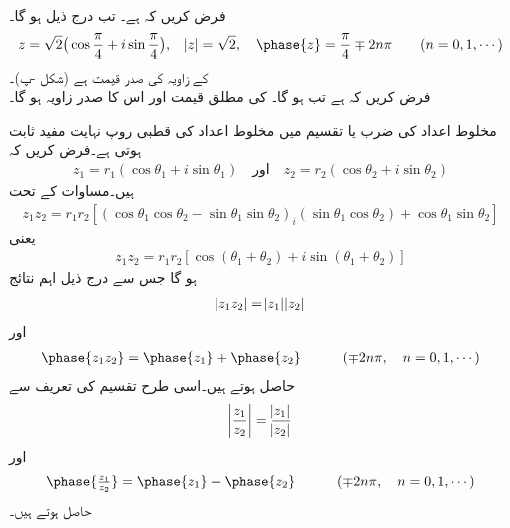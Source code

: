 \quad {}\\
فرض کریں کہ  ہے۔ تب درج ذیل ہو گا۔
\begin{align*}
z=\sqrt{2}\big(\cos \frac{\pi}{4}+i\sin\frac{\pi}{4}\big), \quad \abs{z}=\sqrt{2},\quad \phase{z}=\frac{\pi}{4}\mp2n\pi \quad \quad (n=0,1,\cdots)
\end{align*}
 کے زاویہ کی صدر قیمت  ہے (شکل -پ)۔
\quad {}\\
فرض کریں کہ  ہے تب  ہو گا۔ کی مطلق قیمت  اور اس کا صدر زاویہ  ہو گا۔

مخلوط اعداد کی  ضرب یا تقسیم میں مخلوط اعداد کی قطبی روپ نہایت مفید ثابت ہوتی ہے۔فرض کریں کہ
\begin{align*}
z_1=r_1(\cos\theta_1+i\sin\theta_1)\quad \text{اور}\quad z_2=r_2(\cos \theta_2+i\sin\theta_2)
\end{align*} 
ہیں۔مساوات  کے تحت 
\begin{align*}
z_1z_2=r_1r_2[(\cos\theta_1\cos\theta_2-\sin\theta_1\sin\theta_2)_i(\sin\theta_1\cos\theta_2)+\cos\theta_1\sin\theta_2]
\end{align*}
یعنی
\begin{align}\label{مساوات_مخلوط_ضرب_نتائج_الف}
z_1z_2=r_1r_2[\cos(\theta_1+\theta_2)+i\sin(\theta_1+\theta_2)]
\end{align}
ہو گا جس سے درج ذیل اہم نتائج
\begin{align}\label{مساوات_مخلوط_ضرب_نتائج_ب}
\abs{z_1z_2}=\abs{z_1}\abs{z_2}
\end{align}
اور
\begin{align}\label{مساوات_مخلوط_ضرب_نتائج_پ}
\phase{z_1z_2}=\phase{z_1}+\phase{z_2}\quad \quad\quad (\mp 2n\pi, \quad n=0,1,\cdots)
\end{align}
حاصل ہوتے ہیں۔اسی طرح تقسیم کی تعریف سے 
\begin{align}\label{مساوات_مخلوط_تقسیم_نتائج_الف}
\abs{\frac{z_1}{z_2}}=\frac{\abs{z_1}}{\abs{z_2}}
\end{align}
اور
\begin{align}\label{مساوات_مخلوط_تقسیم_نتائج_ب}
\phase{\tfrac{z_1}{z_2}}=\phase{z_1}-\phase{z_2} \quad \quad\quad (\mp 2n\pi, \quad n=0,1,\cdots)
\end{align}
حاصل ہوتے ہیں۔

